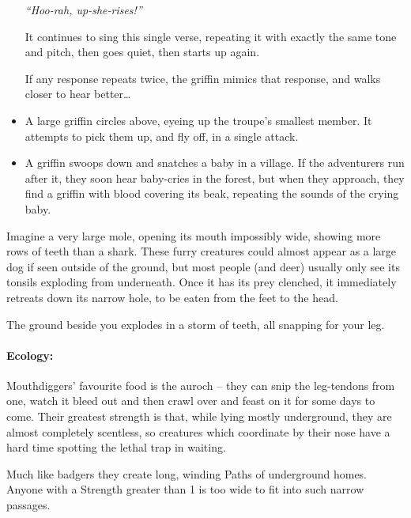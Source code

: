 \begin{multicols}{2}
\begin{itemize}
    \textit{``Hoo-rah, up-she-rises!''}

    It continues to sing this single verse, repeating it with exactly the same tone and pitch, then goes quiet, then starts up again.

    If any response repeats twice, the griffin mimics that response, and walks closer to hear better\ldots
  \fi
  \item
  A large griffin circles above, eyeing up the troupe's smallest member.
  It attempts to pick them up, and fly off, in a single attack.
  \item
  A griffin swoops down and snatches a baby in a village.
  If the adventurers run after it, they soon hear baby-cries in the forest, but when they approach, they find a griffin with blood covering its beak, repeating the sounds of the crying baby.

\end{itemize}

\label{mouthdigger}

Imagine a very large mole, opening its mouth impossibly wide, showing more rows of teeth than a shark.
These furry creatures could almost appear as a large dog if seen outside of the ground, but most people (and deer) usually only see its tonsils exploding from underneath.
Once it has its prey clenched, it immediately retreats down its narrow hole, to be eaten from the feet to the head.

\begin{boxtext}

  The ground beside you explodes in a storm of teeth, all snapping for your leg.

\end{boxtext}

\paragraph{Ecology:} Mouthdiggers' favourite food is the auroch -- they can snip the leg-tendons from one, watch it bleed out and then crawl over and feast on it for some days to come.
Their greatest strength is that, while lying mostly underground, they are almost completely scentless, so creatures which coordinate by their nose have a hard time spotting the lethal trap in waiting.

Much like badgers they create long, winding Paths of underground homes.  Anyone with a Strength greater than 1 is too wide to fit into such narrow passages.


\end{multicols}
